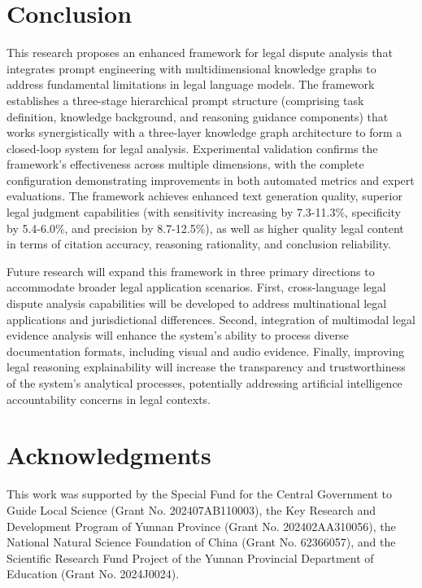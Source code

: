 \documentclass{article}
\theoremstyle{plain}
\theoremstyle{definition}
\begin{document}
\section{Conclusion}
\label{sec5}

This research proposes an enhanced framework for legal dispute analysis that integrates prompt engineering with multidimensional knowledge graphs to address fundamental limitations in legal language models. The framework establishes a three-stage hierarchical prompt structure (comprising task definition, knowledge background, and reasoning guidance components) that works synergistically with a three-layer knowledge graph architecture to form a closed-loop system for legal analysis. Experimental validation confirms the framework's effectiveness across multiple dimensions, with the complete configuration demonstrating improvements in both automated metrics and expert evaluations. The framework achieves enhanced text generation quality, superior legal judgment capabilities (with sensitivity increasing by 7.3-11.3\%, specificity by 5.4-6.0\%, and precision by 8.7-12.5\%), as well as higher quality legal content in terms of citation accuracy, reasoning rationality, and conclusion reliability.

Future research will expand this framework in three primary directions to accommodate broader legal application scenarios. First, cross-language legal dispute analysis capabilities will be developed to address multinational legal applications and jurisdictional differences. Second, integration of multimodal legal evidence analysis will enhance the system's ability to process diverse documentation formats, including visual and audio evidence. Finally, improving legal reasoning explainability will increase the transparency and trustworthiness of the system's analytical processes, potentially addressing artificial intelligence accountability concerns in legal contexts.

\section*{Acknowledgments}
This work was supported by the Special Fund for the Central Government to Guide Local Science (Grant No. 202407AB110003), the Key Research and Development Program of Yunnan Province (Grant No. 202402AA310056), the National Natural Science Foundation of China (Grant No. 62366057), and the Scientific Research Fund Project of the Yunnan Provincial Department of Education (Grant No. 2024J0024).
\end{document}
